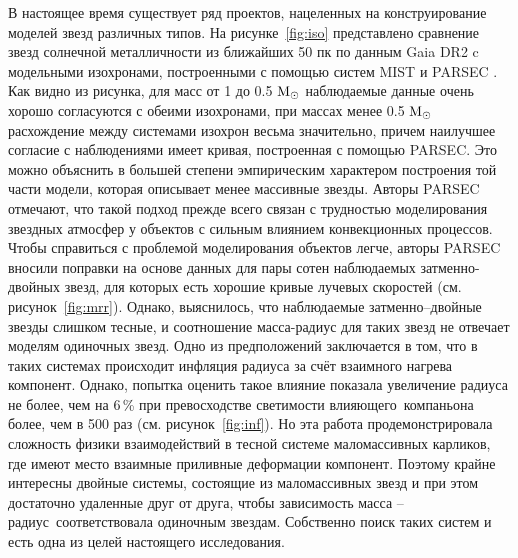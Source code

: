 В настоящее время существует ряд проектов, нацеленных на конструирование моделей звезд различных типов. На рисунке~\ref{fig:iso} представлено сравнение звезд солнечной металличности из ближайших 50 пк по данным Gaia DR2 c модельными изохронами, построенными с помощью систем MIST \cite{2016ApJ...823..102C} и PARSEC \cite{2012MNRAS.427..127B}. Как видно из рисунка, для масс от 1 до 0.5 \(\textup{M}_\odot\) наблюдаемые данные очень хорошо согласуются с обеими изохронами, при массах менее 0.5 \(\textup{M}_\odot\) расхождение между системами изохрон весьма значительно, причем наилучшее согласие с наблюдениями имеет кривая, построенная с помощью PARSEC. Это можно объяснить в большей степени эмпирическим характером построения той части модели, которая описывает менее массивные звезды. Авторы PARSEC отмечают, что такой подход прежде всего связан с трудностью моделирования звездных атмосфер у объектов с сильным влиянием конвекционных процессов. Чтобы справиться с проблемой моделирования объектов легче, авторы PARSEC вносили поправки на основе данных для пары сотен наблюдаемых затменно-двойных звезд, для которых есть хорошие кривые лучевых скоростей (см. рисунок~\ref{fig:mrr}). Однако, выяснилось, что наблюдаемые затменно--двойные звезды слишком тесные, и соотношение масса-радиус для таких звезд не отвечает моделям одиночных звезд. Одно из предположений заключается в том, что в таких системах происходит инфляция радиуса за счёт взаимного нагрева компонент. Однако, попытка оценить такое влияние показала увеличение радиуса не более, чем на 6\,\%  при превосходстве светимости \glqq влияющего\grqq\ компаньона более, чем в 500 раз (см. рисунок~\ref{fig:inf}). Но эта работа продемонстрировала сложность физики взаимодействий в тесной системе маломассивных карликов, где имеют место  взаимные приливные деформации компонент. Поэтому крайне интересны двойные системы, состоящие из маломассивных звезд и при этом достаточно удаленные друг от друга, чтобы зависимость \glqq масса -- радиус\grqq\ соответствовала одиночным звездам. Собственно поиск таких систем и есть одна из целей настоящего исследования.

